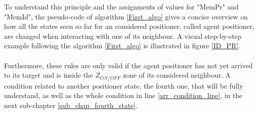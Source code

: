 \documentclass[]{spie}  %
\begin{document}
	 To understand this principle and the assignments of values for "MemPr"  and "MemId", the pseudo-code of algorithm \ref{First_algo} gives a concise overview on how all the states seen so far for an considered positioner, called agent positioner, are changed when interacting with one of its neighbour. A visual step-by-step example following the algorithm \ref{First_algo} is illustrated in figure \ref{ID_PR}. \\\\
	 Furthermore, these rules are only valid if the agent positioner has not yet arrived to its target and is inside the $Z_{ON/OFF}$ zone of its considered neighbour.  
	 A condition related to another positioner state, the fourth one, that will be fully understand, as well as the whole condition in line \ref{arr_condition_line}, in the next sub-chapter \ref{sub_chap_fourth_state}.\\\\
\end{document}
